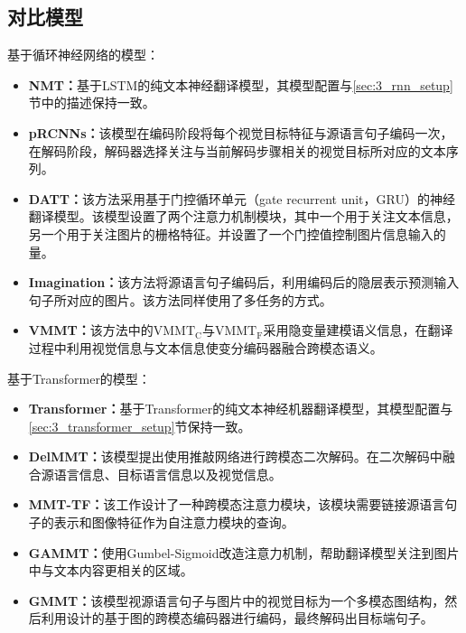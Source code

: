 \subsection{对比模型}
基于循环神经网络的模型：
\begin{itemize}
    \item \textbf{NMT：}基于LSTM的纯文本神经翻译模型，其模型配置与\ref{sec:3_rnn_setup}节中的描述保持一致。
    \item \textbf{pRCNNs：}该模型在编码阶段将每个视觉目标特征与源语言句子编码一次，在解码阶段，解码器选择关注与当前解码步骤相关的视觉目标所对应的文本序列。
    \item \textbf{DATT：}该方法采用基于门控循环单元（gate recurrent unit，GRU）的神经翻译模型。该模型设置了两个注意力机制模块，其中一个用于关注文本信息，另一个用于关注图片的栅格特征。并设置了一个门控值控制图片信息输入的量。
    \item \textbf{Imagination：}该方法将源语言句子编码后，利用编码后的隐层表示预测输入句子所对应的图片。该方法同样使用了多任务的方式。
    \item \textbf{VMMT：}该方法中的$ \mathrm{VMMT_C} $与$ \mathrm{VMMT_F} $采用隐变量建模语义信息，在翻译过程中利用视觉信息与文本信息使变分编码器融合跨模态语义。
\end{itemize}

基于Transformer的模型：
\begin{itemize}
    \item \textbf{Transformer：}基于Transformer的纯文本神经机器翻译模型，其模型配置与\ref{sec:3_transformer_setup}节保持一致。
    \item \textbf{DelMMT：}该模型提出使用推敲网络进行跨模态二次解码。在二次解码中融合源语言信息、目标语言信息以及视觉信息。
    \item \textbf{MMT-TF：}该工作设计了一种跨模态注意力模块，该模块需要链接源语言句子的表示和图像特征作为自注意力模块的查询。
    \item \textbf{GAMMT：}使用Gumbel-Sigmoid改造注意力机制，帮助翻译模型关注到图片中与文本内容更相关的区域。
    \item \textbf{GMMT：}该模型视源语言句子与图片中的视觉目标为一个多模态图结构，然后利用设计的基于图的跨模态编码器进行编码，最终解码出目标端句子。
\end{itemize}
